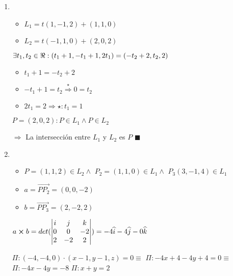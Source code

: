 \documentclass[../practica_01.tex]{subfiles}
\begin{document}
    \begin{enumerate}
        \item
            \begin{itemize}
                \item $L_1 = t(1,-1,2) + (1,1,0)$
                \item $L_2 = t(-1,1,0) + (2,0,2)$
            \end{itemize}

            $\exists t_1, t_2 \in \real : (t_1+1,-t_1+1,2t_1) = (-t_2+2,t_2,2)$

            \begin{itemize}
                \item $t_1+1 = -t_2+2$
                \item $-t_1+1 = t_2 \stackrel{\star}{\Rightarrow} 0 = t_2$
                \item $2t_1 = 2 \Rightarrow \star: t_1 = 1$
            \end{itemize}

            $P = (2,0,2) : P\in L_1 \wedge P \in L_2$

            $\Rightarrow$ La intersección entre $L_1$ y $L_2$ es $P$ $\blacksquare$

        \item 
        \begin{itemize}
                \item $P = (1,1,2) \in L_2 \wedge$
                    $ P_2 = (1,1,0) \in L_1 \wedge $
                    $ P_3 (3,-1,4) \in L_1$
                \item $a = \overrightarrow{PP_2} = (0,0,-2)$
                \item $b = \overrightarrow{PP_3} = (2,-2,2)$
            \end{itemize}

            $a \crossproduct b = det(\begin{vmatrix}
                i & j & k \\
                0 & 0 & -2 \\
                2 & -2 & 2
            \end{vmatrix}) = -4\widehat{i} - 4\widehat{j} - 0\widehat{k}$

            $\Pi: (-4,-4,0) \cdot (x-1,y-1,z) = 0 \equiv $
            $\Pi: -4x + 4 -4y + 4 = 0 \equiv$
            $\Pi: -4x -4y  = -8 $
            $\Pi: x + y  = 2 $

    \end{enumerate}
\end{document}
